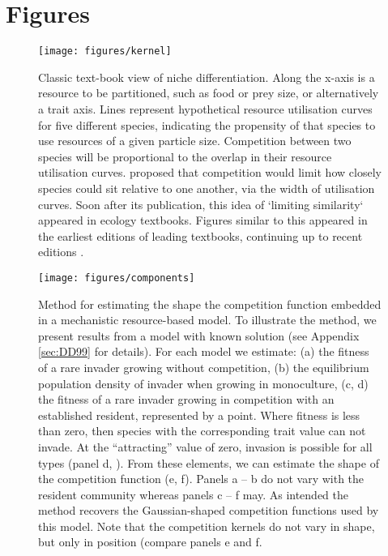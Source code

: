 \documentclass[a4paper,11pt]{article}
\begin{document}
\clearpage

\section{Figures}

\begin{figure}[h]
  \centering
  \texttt{[image: figures/kernel]}
  \caption{Classic text-book view of niche differentiation.  Along the
    x-axis is a resource to be partitioned, such as food or prey size,
    or alternatively a trait axis.  Lines represent hypothetical
    resource utilisation curves for five different species, indicating
    the propensity of that species to use resources of a given particle size.
    Competition between two species will be proportional to
    the overlap in their resource utilisation
    curves. \citet{MacArthur-1967} proposed that competition would
    limit how closely species could sit relative to one another, via
    the width of utilisation curves. Soon after its publication,
    this idea of `limiting similarity` appeared in ecology textbooks. Figures similar to this appeared in the earliest
 editions of leading textbooks, continuing up to recent editions
    \citep{Begon-1986, Begon-2006, Krebs-1978, Krebs-2013,
      Ricklefs-1973, Ricklefs-1999}.}
  \label{fig:competition-kernels}
\end{figure}

\begin{figure}[h]
 \centering
 \texttt{[image: figures/components]}
 \caption{Method for estimating the shape the competition function
   embedded in a mechanistic resource-based model. To illustrate the
   method, we present results from a model with known solution
   \citep{Dieckmann-1999} (see Appendix \ref{sec:DD99} for
   details). For each model we estimate: (a) the fitness of a rare
   invader growing without competition, (b) the equilibrium population
   density of invader when growing in monoculture, (c, d) the fitness
   of a rare invader growing in competition with an established
   resident, represented by a point.  Where fitness is less than zero,
   then species with the corresponding trait value can not invade.  At
   the ``attracting'' value of zero, invasion is possible for all
   types (panel d, \citealt{Dieckmann-1999}).  From these elements, we
   can estimate the shape of the competition function (e, f).  Panels
   a -- b do not vary with the resident community whereas panels c --
   f may.
   As intended the method recovers the Gaussian-shaped competition
   functions used by this model.  Note that the competition kernels do
   not vary in shape, but only in position (compare panels e and f.}
  \label{fig:components}
\end{figure}
\end{document}
